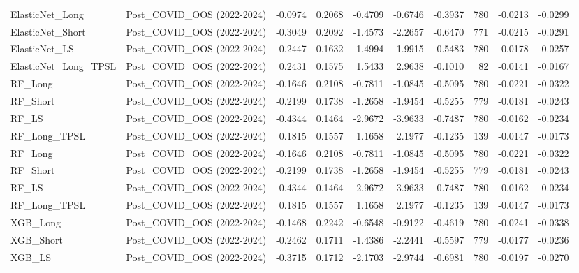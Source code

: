 \begin{tabular}{llrrrrrrrr}
\cline{1-10}
ElasticNet\_Long & Post\_COVID\_OOS (2022-2024) & -0.0974 & 0.2068 & -0.4709 & -0.6746 & -0.3937 & 780 & -0.0213 & -0.0299 \\
\cline{1-10}
ElasticNet\_Short & Post\_COVID\_OOS (2022-2024) & -0.3049 & 0.2092 & -1.4573 & -2.2657 & -0.6470 & 771 & -0.0215 & -0.0291 \\
\cline{1-10}
ElasticNet\_LS & Post\_COVID\_OOS (2022-2024) & -0.2447 & 0.1632 & -1.4994 & -1.9915 & -0.5483 & 780 & -0.0178 & -0.0257 \\
\cline{1-10}
ElasticNet\_Long\_TPSL & Post\_COVID\_OOS (2022-2024) & 0.2431 & 0.1575 & 1.5433 & 2.9638 & -0.1010 & 82 & -0.0141 & -0.0167 \\
\cline{1-10}
RF\_Long & Post\_COVID\_OOS (2022-2024) & -0.1646 & 0.2108 & -0.7811 & -1.0845 & -0.5095 & 780 & -0.0221 & -0.0322 \\
\cline{1-10}
RF\_Short & Post\_COVID\_OOS (2022-2024) & -0.2199 & 0.1738 & -1.2658 & -1.9454 & -0.5255 & 779 & -0.0181 & -0.0243 \\
\cline{1-10}
RF\_LS & Post\_COVID\_OOS (2022-2024) & -0.4344 & 0.1464 & -2.9672 & -3.9633 & -0.7487 & 780 & -0.0162 & -0.0234 \\
\cline{1-10}
RF\_Long\_TPSL & Post\_COVID\_OOS (2022-2024) & 0.1815 & 0.1557 & 1.1658 & 2.1977 & -0.1235 & 139 & -0.0147 & -0.0173 \\
\cline{1-10}
RF\_Long & Post\_COVID\_OOS (2022-2024) & -0.1646 & 0.2108 & -0.7811 & -1.0845 & -0.5095 & 780 & -0.0221 & -0.0322 \\
\cline{1-10}
RF\_Short & Post\_COVID\_OOS (2022-2024) & -0.2199 & 0.1738 & -1.2658 & -1.9454 & -0.5255 & 779 & -0.0181 & -0.0243 \\
\cline{1-10}
RF\_LS & Post\_COVID\_OOS (2022-2024) & -0.4344 & 0.1464 & -2.9672 & -3.9633 & -0.7487 & 780 & -0.0162 & -0.0234 \\
\cline{1-10}
RF\_Long\_TPSL & Post\_COVID\_OOS (2022-2024) & 0.1815 & 0.1557 & 1.1658 & 2.1977 & -0.1235 & 139 & -0.0147 & -0.0173 \\
\cline{1-10}
XGB\_Long & Post\_COVID\_OOS (2022-2024) & -0.1468 & 0.2242 & -0.6548 & -0.9122 & -0.4619 & 780 & -0.0241 & -0.0338 \\
\cline{1-10}
XGB\_Short & Post\_COVID\_OOS (2022-2024) & -0.2462 & 0.1711 & -1.4386 & -2.2441 & -0.5597 & 779 & -0.0177 & -0.0236 \\
\cline{1-10}
XGB\_LS & Post\_COVID\_OOS (2022-2024) & -0.3715 & 0.1712 & -2.1703 & -2.9744 & -0.6981 & 780 & -0.0197 & -0.0270 \\

\end{tabular}
